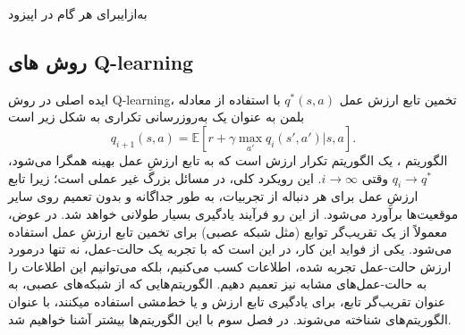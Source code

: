 \‌به‌ازای{برای هر گام در اپیزود}
\subsection{روش های Q-learning}
ایده اصلی در روش 
Q-learning،
 تخمین تابع ارزش عمل  
$q^*(s,a)$ 
با استفاده از معادله بلمن به عنوان یک به‌روزرسانی تکراری به شکل زیر است
\cite{mnih2013playing}
$$q_{i+1}(s,a) = \mathbb{E}[r+ \gamma \max_{a'} q_i(s',a')|s,a].$$
الگوریتم 
،
یک الگوریتم تکرار ارزش است که به تابع ارزشِ عمل بهینه همگرا می‌شود، 
$q_i \longrightarrow q^*$
وقتی
$i \longrightarrow \infty$.
این رویکرد کلی، در مسائل بزرگ غیر عملی است؛
زیرا تابع ارزشِ عمل برای هر دنباله از تجربیات،  به طور جداگانه و بدون تعمیم روی سایر موقعیت‌ها برآورد می‌شود. از این رو فرآیند یادگیری بسیار طولانی خواهد شد. در عوض، معمولاً از یک تقریب‌گر توابع (مثل شبکه عصبی) برای تخمین تابع ارزشِ عمل استفاده می‌شود.  یکی از فواید این کار، در این است که با تجربه یک حالت-عمل، نه تنها درمورد ارزش حالت-عمل تجربه شده، اطلاعات کسب می‌کنیم، بلکه می‌توانیم این اطلاعات را به حالت-عمل‌های مشابه نیز تعمیم دهیم.
الگوریتم‌هایی که از شبکه‌های عصبی، به عنوان تقریب‌گر تابع، برای یادگیری تابع ارزش و یا خط‌مشی استفاده می\nf کنند، با عنوان الگوریتم‌های 
\textit{}
شناخته می‌شوند. در فصل سوم با این الگوریتم‌ها بیشتر آشنا خواهیم شد.